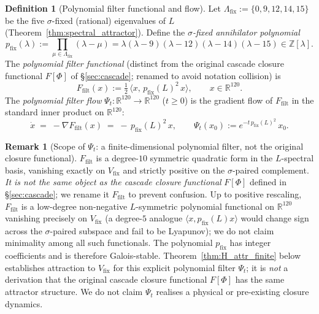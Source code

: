 \documentclass[11pt, a4paper]{amsart}
\theoremstyle{definition}
\newtheorem{definition}[theorem]{Definition}
\newtheorem{remark}[theorem]{Remark}
\newcommand{\R}{\mathbb{R}}
\newcommand{\Z}{\mathbb{Z}}
\begin{document}
\begin{definition}[Polynomial filter functional and flow]\label{def:closure_flow}
Let $\Lambda_{\mathrm{fix}} := \{0, 9, 12, 14, 15\}$ be the five
$\sigma$-fixed (rational) eigenvalues of $L$
(Theorem~\ref{thm:spectral_attractor}). Define the
\emph{$\sigma$-fixed annihilator polynomial}
\[
p_{\mathrm{fix}}(\lambda) :=
\prod_{\mu \in \Lambda_{\mathrm{fix}}}(\lambda - \mu)
= \lambda(\lambda-9)(\lambda-12)(\lambda-14)(\lambda-15)
\in \Z[\lambda].
\]
The \emph{polynomial filter functional} (distinct from the original
cascade closure functional $F[\Phi]$ of \S\ref{sec:cascade}; renamed
to avoid notation collision) is
\[
F_{\mathrm{filt}}(x) := \tfrac{1}{2}\,\langle x,\, p_{\mathrm{fix}}(L)^2\, x\rangle,
\qquad x \in \R^{120}.
\]
The \emph{polynomial filter flow} $\Psi_t : \R^{120} \to \R^{120}$
($t \ge 0$) is the gradient flow of $F_{\mathrm{filt}}$ in the
standard inner product on $\R^{120}$:
\[
\dot{x} \;=\; -\nabla F_{\mathrm{filt}}(x) \;=\; -\, p_{\mathrm{fix}}(L)^2\, x,
\qquad \Psi_t(x_0) := e^{-t\,p_{\mathrm{fix}}(L)^2}\,x_0.
\]
\end{definition}

\begin{remark}[Scope of $\Psi_t$: a finite-dimensional polynomial filter, not the original closure functional]\label{rmk:closure_flow_canonical}
$F_{\mathrm{filt}}$ is a degree-$10$ symmetric quadratic form in
the $L$-spectral basis, vanishing exactly on $V_{\mathrm{fix}}$ and
strictly positive on the $\sigma$-paired complement. \emph{It is
not the same object as the cascade closure functional} $F[\Phi]$
defined in \S\ref{sec:cascade}; we rename it $F_{\mathrm{filt}}$ to
prevent confusion. Up to positive rescaling, $F_{\mathrm{filt}}$ is
a low-degree non-negative $L$-symmetric polynomial functional on
$\R^{120}$ vanishing precisely on $V_{\mathrm{fix}}$ (a degree-$5$
analogue $\langle x, p_{\mathrm{fix}}(L) x\rangle$ would change
sign across the $\sigma$-paired subspace and fail to be Lyapunov);
we do not claim minimality among all such functionals. The polynomial $p_{\mathrm{fix}}$ has integer
coefficients and is therefore Galois-stable. Theorem~\ref{thm:H_attr_finite}
below establishes attraction to $V_{\mathrm{fix}}$ for this
explicit polynomial filter $\Psi_t$; it is \emph{not} a derivation
that the original cascade closure functional $F[\Phi]$ has the
same attractor structure. We do not claim $\Psi_t$ realises a
physical or pre-existing closure dynamics.
\end{remark}
\end{document}
